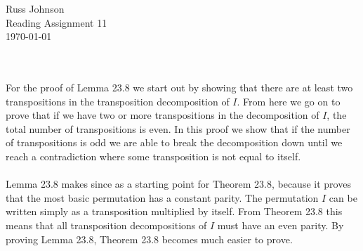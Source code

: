 \documentclass[11pt,a4paper]{article}
\begin{document}
\begin{flushright}
Russ Johnson\\
Reading Assignment 11\\
\today\\
\end{flushright}
~\\
~\\
For the proof of Lemma 23.8 we start out by showing that there are at least two transpositions in the transposition decomposition of $I$. From here we go on to prove that if we have two or more transpositions in the decomposition of $I$, the total number of transpositions is even. In this proof we show that if the number of transpositions is odd we are able to break the decomposition down until we reach a contradiction where some transposition is not equal to itself.\\
~\\
Lemma 23.8 makes since as a starting point for Theorem 23.8, because it proves that the most basic permutation has a constant parity. The permutation $I$ can be written simply as a transposition multiplied by itself. From Theorem 23.8 this means that all transposition decompositions of $I$ must have an even parity. By proving Lemma 23.8, Theorem 23.8 becomes much easier to prove.
\end{document}
